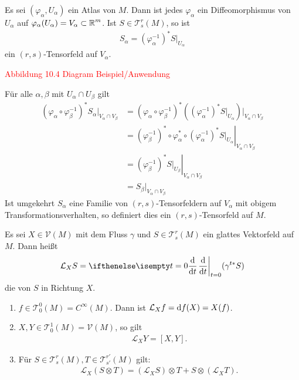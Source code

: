 \begin{bsp}[Anwendung]
  Es sei $(\varphi_{\alpha},U_{\alpha})$ ein Atlas von $M$. Dann ist jedes $\varphi_{\alpha}$ ein Diffeomorphismus von $U_{\alpha}$ auf $\varphi_{\alpha}(U_{\alpha}) = V_{\alpha} \subset \operatorname{\mathbb{R}}^m$. Ist $S \in \mathcal T_s^r(M)$, so ist
  \begin{align*}
    S_{\alpha} = (\varphi_{\alpha}^{-1})^{*}S|_{U_\alpha}
  \end{align*}
  ein $(r,s)$-Tensorfeld auf $V_{\alpha}$.

  \textcolor{red}{Abbildung 10.4 Diagram Beispiel/Anwendung}

  Für alle $\alpha, \beta$ mit $U_{\alpha} \cap U_{\beta}$ gilt
  \begin{align*}
    (\varphi_{\alpha} \circ \varphi_{\beta}^{-1})^{*}S_{\alpha}|_{V_{\alpha} \cap V_{\beta}} & = (\varphi_{\alpha} \circ \varphi_{\beta}^{-1})^{*}\left((\varphi_{\alpha}^{-1})^{*}S|_{U_{\alpha}}\right)|_{V_{\alpha}\cap V_{\beta}}\\
    & = \left.(\varphi_{\beta}^{-1})^{*} \circ \varphi_{\alpha}^{*} \circ (\varphi_{\alpha}^{-1})^{*} S|_{U_{\alpha}}\right|_{V_{\alpha} \cap V_{\beta}}\\
    & = \left.(\varphi_{\beta}^{-1})^{*}S|_{U_{\beta}}\right|_{V_{\alpha} \cap V_{\beta}}\\
    & = S_{\beta}|_{V_{\alpha} \cap V_{\beta}}
  \end{align*}
  Ist umgekehrt $S_\alpha$ eine Familie von $(r,s)$-Tensorfeldern auf $V_{\alpha}$ mit obigem Transformationsverhalten, so definiert dies ein $(r,s)$-Tensorfeld auf $M$.
\end{bsp}

\begin{Dfn}
  Es sei $X \in \mathcal V(M)$ mit dem Fluss $\gamma$ und $S \in \mathcal T_s^r(M)$ ein glattes Vektorfeld auf $M$. Dann heißt
  \begin{align*}
    \mathcal L_X S = \difffrac[t=0]{}{t}(\gamma^{t*}S)
  \end{align*}
  die  von $S$ in Richtung $X$.
\end{Dfn}

\begin{emptythm}[Eigenschaften]\begin{enumerate}[label=\arabic*)]
\item
	$f \in \mathcal T_0^0(M) = C^{\infty}(M)$. Dann ist $\mathcal L_Xf = \mathrm{d} f (X) = X(f)$.
\item
	$X,Y \in \mathcal T_0^1(M) = \mathcal V(M)$, so gilt
	\begin{align*}
		\mathcal L_XY = [X,Y].
	\end{align*}
\item
	Für $S \in \mathcal T_s^r(M), T \in \mathcal T_{s'}^{r'}(M)$ gilt:
	\begin{align*}
		\mathcal L_X(S \otimes T) = (\mathcal L_XS) \otimes T + S \otimes (\mathcal L_X T).
	\end{align*}
\end{enumerate}\end{emptythm}


